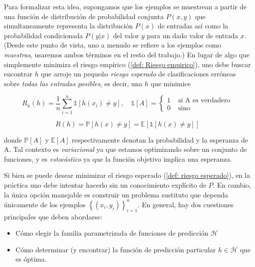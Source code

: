 Para formalizar esta idea, supongamos que los ejemplos se muestrean a partir de una funci\'on de distribuci\'on de probabilidad conjunta $P (x, y)$ que simultaneamente representa la distribuci\'on $P (x)$ de entradas as\'i como la probabilidad condicionada $P (y \vert x)$ del valor $y$ para un dado valor de entrada $x$. (Desde este punto de vista, uno a menudo se refiere a los ejemplos como \textit{muestras}, usaremos ambos t\'erminos en el resto del trabajo.) En lugar de algo que simplemente minimiza el riesgo emp\'irico (\ref{def: Riesgo empirico}), uno debe buscar encontrar $h$ que arroje un peque\~no \textit{riesgo esperado} de clasificaciones err\'oneas sobre \textit{todas las entradas posibles}, es decir, una $h$ que minimice

\begin{equation}
\label{def: Riesgo empirico}
R_n(h) = \frac{1}{n}\sum\limits_{i=1}^{n}{\mathbb{1}\left[ h(x_i) \neq y \right]}, \quad \mathbb{1}\left[A\right] = \left\lbrace \begin{array}{cc}
1 & \text{ si A es verdadero} \\
0 & \text{ sino }
\end{array}\right.
\end{equation}

\begin{equation}
\label{def: riesgo esperado}
R(h)=\mathbb{P}\left[h(x) \neq y \right] = \mathbb{E} \left[\mathbb{1} \left[h(x) \neq y \right] \right]
\end{equation}

donde $\mathbb{P}\left[A \right]$ y $\mathbb{E}\left[A \right]$ respectivamente denotan la probabilidad y la esperanza de A. Tal contexto es \textit{variacional} ya que estamos optimizando sobre un conjunto de funciones, y es \textit{estoc\'astico} ya que la funci\'on objetivo implica una esperanza.

Si bien se puede desear minimizar el riesgo esperado (\ref{def: riesgo esperado}), en la pr\'actica uno debe intentar hacerlo sin un conocimiento expl\'icito de $P$. En cambio, la \'unica opci\'on manejable es construir un problema sustituto que dependa \'unicamente de los ejemplos $\left\lbrace\left(x_{i},y_{i}\right)\right\rbrace^{n}_{i=1}$. En general, hay dos cuestiones principales que deben abordarse: 

\begin{itemize}
	\item C\'omo elegir la familia parametrizada de funciones de predicci\'on $\mathcal{H}$
	\item C\'omo determinar (y encontrar) la funci\'on de predicci\'on particular $h \in \mathcal{H}$ que es \'optima.
\end{itemize}

